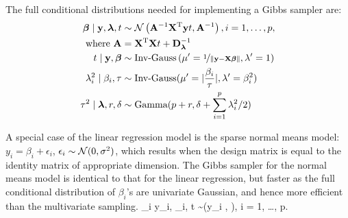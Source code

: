 \documentclass[11pt]{article}
\begin{document}
The full conditional distributions needed for implementing a Gibbs sampler are:	
\begin{align}
\boldsymbol{\beta} \mid {\bf y}, \boldsymbol{\lambda}, t & \sim \mathcal{N} \left( {\bf A}^{-1}{\bf X}^{\rm T} {\bf y} t , {\bf A}^{-1} \right), i = 1, \ldots, p, \\
\text{ where } {\bf A} & = {\bf X}^{\rm T} {\bf X} t + {\bf D}_{\boldsymbol{\lambda}}^{-1} \\
t \mid {\bf y}, \boldsymbol{\beta} & \sim \text{Inv-Gauss} \left(\mu' = \nicefrac{1}{\lVert{\bf y}-{\bf X}\boldsymbol{\beta}\rVert}, \lambda' = 1 \right) \\
\lambda_i^2 \mid \beta_i, \tau & \sim \text{Inv-Gauss}(\mu' = \lvert\frac{\beta_i}{\tau}\rvert, \lambda' = \beta_i^2)\\
\tau^2 \mid \boldsymbol{\lambda}, r, \delta & \sim \text{Gamma}(p + r, \delta + \sum_{i=1}^{p} \lambda_i^2/2)
\end{align}

A special case of the linear regression model is the sparse normal means model: $y_i = \beta_i + \epsilon_i$, $\epsilon_i \sim \mathcal{N}(0,\sigma^2)$, which results when the design matrix is equal to the identity matrix of appropriate dimension. The Gibbs sampler for the normal means model is identical to that for the linear regression, but faster as the full conditional distribution of $\beta_i$'s are univariate Gaussian, and hence more efficient than the multivariate sampling. 
\beq
\beta_i \mid y_i, \lambda_i, t \sim \NormRV \left(y_i ,  \right), i = 1, \ldots, p.
\eeq

%

%



\end{document}
